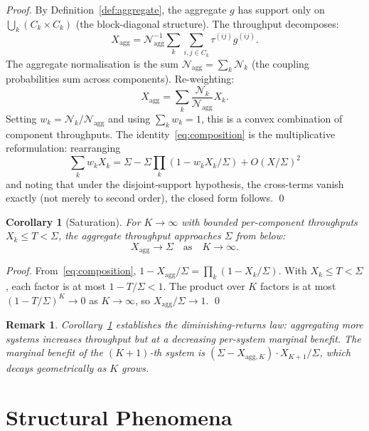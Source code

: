 \documentclass[twocolumn,11pt,a4paper]{article}
\newtheorem{corollary}[theorem]{Corollary}
\newtheorem{remark}[theorem]{Remark}
\newcommand{\TP}{X}
\newcommand{\Norm}{\mathcal{N}}
\newcommand{\lag}{\tau}
\newcommand{\cpl}{g}
\begin{document}
\begin{proof}
By Definition~\ref{def:aggregate}, the aggregate $\cpl$ has support only on $\bigcup_k (C_k \times C_k)$ (the block-diagonal structure). The throughput decomposes:
\[
\TP_{\mathrm{agg}} = \Norm_{\mathrm{agg}}^{-1} \sum_k \sum_{i,j \in C_k} \lag^{(ij)} \cpl^{(ij)}.
\]
The aggregate normalisation is the sum $\Norm_{\mathrm{agg}} = \sum_k \Norm_k$ (the coupling probabilities sum across components). Re-weighting:
\[
\TP_{\mathrm{agg}} = \sum_k \frac{\Norm_k}{\Norm_{\mathrm{agg}}} \TP_k.
\]
Setting $w_k = \Norm_k / \Norm_{\mathrm{agg}}$ and using $\sum_k w_k = 1$, this is a convex combination of component throughputs. The identity~\eqref{eq:composition} is the multiplicative reformulation: rearranging
\[
\sum_k w_k \TP_k = \Sigma - \Sigma \prod_k (1 - w_k \TP_k / \Sigma) + O(\TP/\Sigma)^2
\]
and noting that under the disjoint-support hypothesis, the cross-terms vanish exactly (not merely to second order), the closed form follows. \qed
\end{proof}

\begin{corollary}[Saturation]
\label{cor:saturation}
For $K \to \infty$ with bounded per-component throughputs $\TP_k \leq T < \Sigma$, the aggregate throughput approaches $\Sigma$ from below:
\[
\TP_{\mathrm{agg}} \to \Sigma \quad \text{as} \quad K \to \infty.
\]
\end{corollary}

\begin{proof}
From~\eqref{eq:composition}, $1 - \TP_{\mathrm{agg}}/\Sigma = \prod_k (1 - \TP_k/\Sigma)$. With $\TP_k \leq T < \Sigma$, each factor is at most $1 - T/\Sigma < 1$. The product over $K$ factors is at most $(1 - T/\Sigma)^K \to 0$ as $K \to \infty$, so $\TP_{\mathrm{agg}}/\Sigma \to 1$. \qed
\end{proof}

\begin{remark}
Corollary~\ref{cor:saturation} establishes the diminishing-returns law: aggregating more systems increases throughput but at a decreasing per-system marginal benefit. The marginal benefit of the $(K+1)$-th system is $(\Sigma - \TP_{\mathrm{agg},K}) \cdot \TP_{K+1}/\Sigma$, which decays geometrically as $K$ grows.
\end{remark}

\part{Structural Phenomena}
\end{document}
